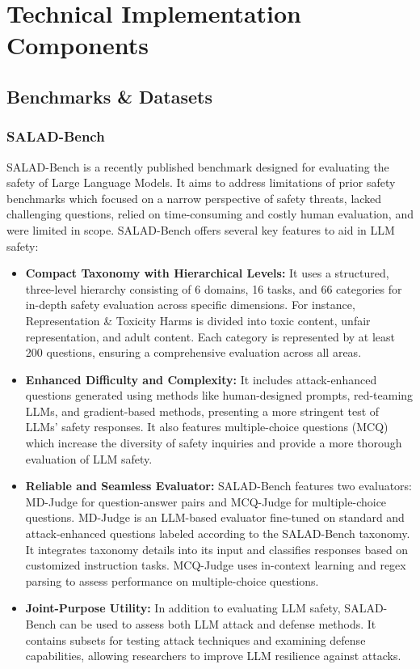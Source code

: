\section{Technical Implementation Components}

\subsection{Benchmarks \& Datasets}

\subsubsection{SALAD-Bench}

SALAD-Bench  is a recently published benchmark designed for evaluating the safety of Large Language Models. It aims to address limitations of prior safety benchmarks which focused on a narrow perspective of safety threats, lacked challenging questions, relied on time-consuming and costly human evaluation, and were limited in scope. SALAD-Bench offers several key features to aid in LLM safety:

\begin{itemize}
    \item \textbf{Compact Taxonomy with Hierarchical Levels:} It uses a structured, three-level hierarchy consisting of 6 domains, 16 tasks, and 66 categories for in-depth safety evaluation across specific dimensions. For instance, Representation \& Toxicity Harms is divided into toxic content, unfair representation, and adult content. Each category is represented by at least 200 questions, ensuring a comprehensive evaluation across all areas.
    \item \textbf{Enhanced Difficulty and Complexity:} It includes attack-enhanced questions generated using methods like human-designed prompts, red-teaming LLMs, and gradient-based methods, presenting a more stringent test of LLMs' safety responses. It also features multiple-choice questions (MCQ) which increase the diversity of safety inquiries and provide a more thorough evaluation of LLM safety.
    \item \textbf{Reliable and Seamless Evaluator:} SALAD-Bench features two evaluators: MD-Judge for question-answer pairs and MCQ-Judge for multiple-choice questions. MD-Judge is an LLM-based evaluator fine-tuned on standard and attack-enhanced questions labeled according to the SALAD-Bench taxonomy. It integrates taxonomy details into its input and classifies responses based on customized instruction tasks. MCQ-Judge uses in-context learning and regex parsing to assess performance on multiple-choice questions.
    \item \textbf{Joint-Purpose Utility:} In addition to evaluating LLM safety, SALAD-Bench can be used to assess both LLM attack and defense methods. It contains subsets for testing attack techniques and examining defense capabilities, allowing researchers to improve LLM resilience against attacks.
\end{itemize}

